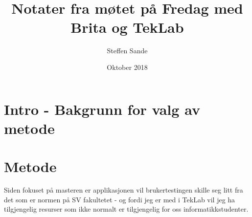 \documentclass{article}
\title{Notater fra møtet på Fredag med Brita og TekLab}
\author{Steffen Sande}
\date{Oktober 2018}
\begin{document}
\maketitle

\section{Intro - Bakgrunn for valg av metode}


\section{Metode}
Siden fokuset på masteren er applikasjonen vil brukertestingen skille seg litt fra det som er normen på SV fakultetet - og fordi jeg er med i TekLab vil jeg ha tilgjengelig resurser som ikke normalt er tilgjengelig for oss informatikkstudenter. 
\end{document}
